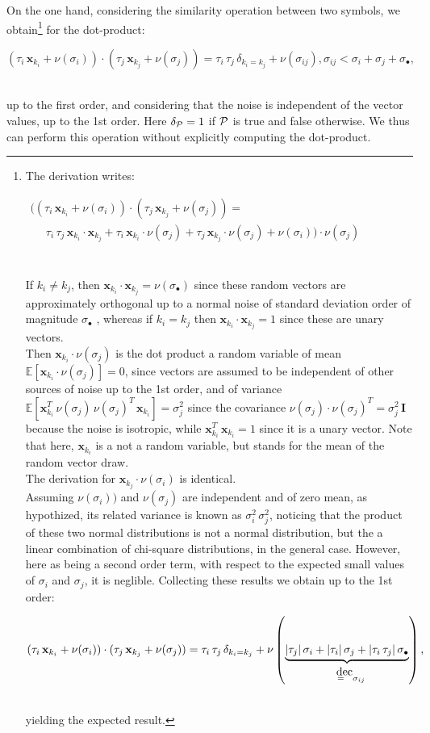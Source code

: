 \documentclass[sn-mathphys]{sn-jnl}
\newcommand{\eqline}[1]{~\vspace{0.1cm}\\\centerline{$#1$}\vspace{0.1cm}\\}
\begin{document}
\begin{appendices}
On the one hand, considering the similarity operation between two symbols, we
obtain\footnote{
The derivation writes:
\eqline{\begin{array}{lc}
((\tau_i \, \mathbf{x}_{k_i} + \nu(\sigma_i)) \cdot (\tau_j \, \mathbf{x}_{k_j} + \nu(\sigma_j))  = \\
    \;\;\;\;\; \tau_i \, \tau_j \, \mathbf{x}_{k_i} \cdot \mathbf{x}_{k_j} +
    \tau_i \, \mathbf{x}_{k_i} \cdot \nu(\sigma_j) +
    \tau_j \, \mathbf{x}_{k_j} \cdot \nu(\sigma_j) +
    \nu(\sigma_i)) \cdot \nu(\sigma_j) \\
\end{array}}
If $k_i \neq k_j$, then $\mathbf{x}_{k_i} \cdot \mathbf{x}_{k_j} = \nu(\sigma_\bullet)$ since these random vectors are approximately orthogonal up to a normal noise of standard deviation order of magnitude $\sigma_\bullet$ \cite{voelker_learning_2014}, whereas if $k_i = k_j$ then $\mathbf{x}_{k_i} \cdot \mathbf{x}_{k_j} = 1$ since these are unary vectors.
\\ Then $\mathbf{x}_{k_i} \cdot \nu(\sigma_j)$ is the dot product a random variable of mean $\mathbb{E}\left[\mathbf{x}_{k_i} \cdot \nu(\sigma_j)\right] = 0$, since vectors are assumed to be independent of other sources of noise up to the 1st order, and of variance $\mathbb{E}\left[\mathbf{x}_{k_i}^T \, \nu(\sigma_j) \, \nu(\sigma_j)^T \, \mathbf{x}_{k_i}\right] = \sigma_j^2$ since the covariance $\nu(\sigma_j) \cdot \nu(\sigma_j)^T = \sigma_j^2 \, \mathbf{I}$ because the noise is isotropic, while $\mathbf{x}_{k_i}^T \, \mathbf{x}_{k_i}=1$ since it is a unary vector. Note that here, $\mathbf{x}_{k_i}$ is a not a random variable, but stands for the mean of the random vector draw.
\\ The derivation for $\mathbf{x}_{k_j} \cdot \nu(\sigma_i)$ is identical.
\\ Assuming $\nu(\sigma_i))$ and $\nu(\sigma_j)$ are independent and of zero mean, as hypothized, its related variance is known as $\sigma_i^2 \, \sigma_j^2$, noticing that the product of these two normal distributions is not a normal distribution, but the a linear combination of chi-square distributions, in the general case. However, here as being a second order term, with respect to the expected small values of $\sigma_i$ and $\sigma_j$, it is neglible.
Collecting these results we obtain up to the 1st order:
\eqline{(\tau_i \, \mathbf{x}_{k_i} + \nu(\sigma_i)) \cdot (\tau_j \, \mathbf{x}_{k_j} + \nu(\sigma_j)) =
  \tau_i \, \tau_j \, \delta_{k_i = k_j} +
  \nu\left(\underbrace{\lvert \tau_j \rvert \, \sigma_i + \lvert \tau_i \rvert \, \sigma_j + \lvert \tau_i \, \tau_j \rvert \, \sigma_\bullet}_{\deq \sigma_{ij}}\right),} yielding the expected result.}
       for the dot-product:
\eqline{(\tau_i \, \mathbf{x}_{k_i} + \nu(\sigma_i)) \cdot (\tau_j \, \mathbf{x}_{k_j} + \nu(\sigma_j)) =
  \tau_i \, \tau_j \, \delta_{k_i = k_j} + \nu(\sigma_{ij}), \sigma_{ij} < \sigma_i + \sigma_j + \sigma_\bullet,}
up to the first order, and considering that the noise is independent of the vector values, up to the 1st order. Here $\delta_{{\cal P}} = 1$ if ${\cal P}$ is true and false otherwise. We thus can perform this operation without explicitly computing the dot-product.


\end{appendices}
\end{document}
